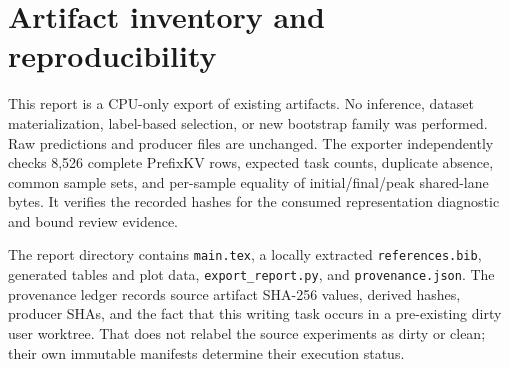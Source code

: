 \documentclass[10pt,letterpaper]{article}
\begin{document}
\clearpage
\section{Artifact inventory and reproducibility}
\label{app:artifacts}
This report is a CPU-only export of existing artifacts. No inference,
dataset materialization, label-based selection, or new bootstrap family
was performed. Raw predictions and producer files are unchanged.
The exporter independently checks 8,526 complete PrefixKV rows, expected
task counts, duplicate absence, common sample sets, and per-sample equality
of initial/final/peak shared-lane bytes. It verifies the recorded hashes
for the consumed representation diagnostic and bound review evidence.

The report directory contains \texttt{main.tex}, a locally extracted
\texttt{references.bib}, generated tables and plot data,
\texttt{export\_report.py}, and \texttt{provenance.json}. The provenance
ledger records source artifact SHA-256 values, derived hashes, producer
SHAs, and the fact that this writing task occurs in a pre-existing dirty
user worktree. That does not relabel the source experiments as dirty or
clean; their own immutable manifests determine their execution status.
\end{document}

